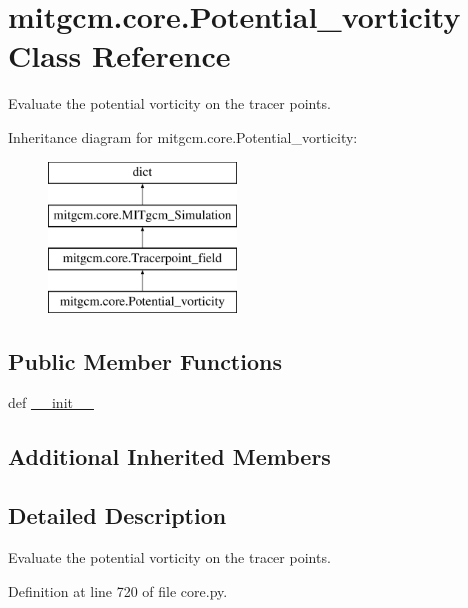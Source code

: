 \hypertarget{classmitgcm_1_1core_1_1Potential__vorticity}{\section{mitgcm.\+core.\+Potential\+\_\+vorticity Class Reference}
\label{classmitgcm_1_1core_1_1Potential__vorticity}
}


Evaluate the potential vorticity on the tracer points.  


Inheritance diagram for mitgcm.\+core.\+Potential\+\_\+vorticity\+:\begin{figure}[H]
\begin{center}
\leavevmode
\includegraphics[height=4.000000cm]{classmitgcm_1_1core_1_1Potential__vorticity}
\end{center}
\end{figure}
\subsection*{Public Member Functions}
\begin{DoxyCompactItemize}
\item 
def \hyperlink{classmitgcm_1_1core_1_1Potential__vorticity_aa5cd85f4c534241e18601d592c30b098}{\+\_\+\+\_\+init\+\_\+\+\_\+}
\end{DoxyCompactItemize}
\subsection*{Additional Inherited Members}


\subsection{Detailed Description}
Evaluate the potential vorticity on the tracer points. 



Definition at line 720 of file core.\+py.



